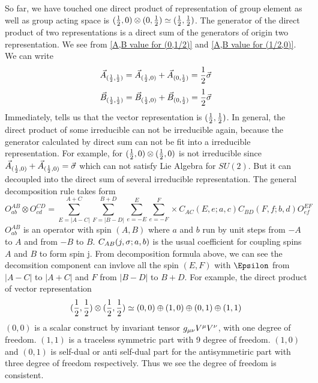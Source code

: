 So far, we have touched one direct product of representation of group element as well as group acting space is 
$(\frac{1}{2},0) \otimes (0,\frac{1}{2}) \simeq (\frac{1}{2},\frac{1}{2})$. The generator of the direct product of two representations is a direct sum of the generators of origin two representation. We see from \eqref{A,B value for (0,1/2)} and \eqref{A,B value for (1/2,0)}. We can write
\begin{equation}
    \vec{A}_{(\frac{1}{2},\frac{1}{2})} 
    = \vec{A}_{(\frac{1}{2},0)} + \vec{A}_{(0,\frac{1}{2})}
    = \frac{1}{2}{\vec{\sigma}}
\end{equation} 
\begin{equation}
    \vec{B}_{(\frac{1}{2},\frac{1}{2})} 
  = \vec{B}_{(\frac{1}{2},0)} + \vec{B}_{(0,\frac{1}{2})}
  = \frac{1}{2}{\vec{\sigma}}
\end{equation}
Immediately, tells us that the vector representation is $(\frac{1}{2},\frac{1}{2})$.
In general, the direct product of some irreducible can not be irreducible again, because the generator calculated by direct sum can not be fit into a irreducible representation. For example, for $(\frac{1}{2},0)\otimes(\frac{1}{2},0)$
is not irreducible since $\vec{A}_{(\frac{1}{2},0)} + \vec{A}_{(\frac{1}{2},0)}
= {\vec{\sigma}}$ which can not satisfy Lie Algebra for $SU(2)$. 
But it can decoupled into the direct sum of several irreducible representation. The general decomposition rule takes form 
\begin{equation}
  O^{AB}_{ab} \otimes O^{CD}_{cd}
  =\sum_{E=|A-C|}^{A+C}
   \sum_{F=|B-D|}^{B+D}
   \sum_{e=-E}^{E}
   \sum_{e=-F}^{F}
   \times
   C_{AC}(E,e;a,c)
   C_{BD}(F,f;b,d)
   O^{EF}_{ef}
\end{equation}
 $O^{AB}_{ab}$ is an operator with spin $(A,B)$ where $a$ and $b$ run by unit steps from $-A$ to $A$ and from $-B$ to $B$. $C_{AB}(j,\sigma;a,b)$ is the usual  coefficient for coupling spins $A$ and $B$ to form spin j. From decomposition formula above, we can see the decomsition component can invlove all the spin $(E,F)$ with $\E$ from $|A-C|$ to $|A+C|$ and $F$ from $|B-D|$ to $B+D$. 
 For example, the direct product of vector representation 
 \begin{equation}
 (\frac{1}{2},\frac{1}{2})\otimes(\frac{1}{2},\frac{1}{2}) \simeq (0,0)\oplus(1,0)\oplus(0,1)\oplus(1,1)
 \end{equation} 
 $(0,0)$ is a scalar construct by invariant tensor $g_{\mu\nu}V^{\mu}V^{\nu}$, with one degree of freedom.
 $(1,1)$ is a traceless symmetric part with 9 degree of freedom.
 $(1,0)$ and $(0,1)$ is self-dual or anti self-dual part for the antisymmetiric part with three degree of freedom respectively. Thus we see the degree of freedom is consistent.
 
